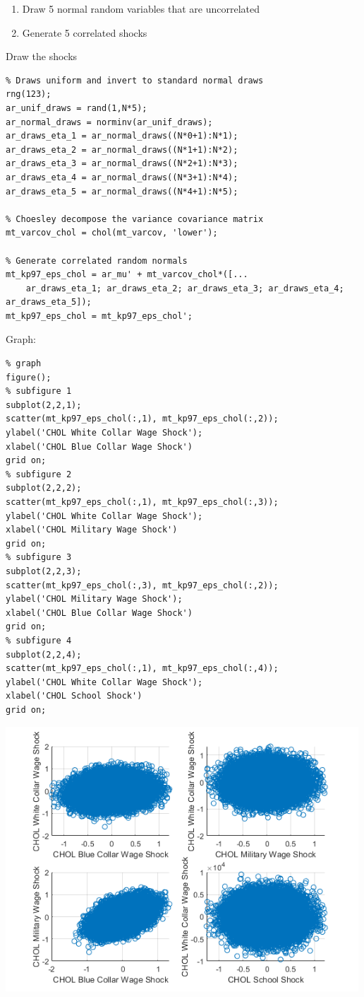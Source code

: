 \documentclass[
]{book}
\begin{document}
\begin{enumerate}
\def\labelenumi{\arabic{enumi}.}
\item
  Draw 5 normal random variables that are uncorrelated
\item
  Generate 5 correlated shocks
\end{enumerate}

Draw the shocks

\begin{verbatim}
% Draws uniform and invert to standard normal draws
rng(123);
ar_unif_draws = rand(1,N*5);
ar_normal_draws = norminv(ar_unif_draws);
ar_draws_eta_1 = ar_normal_draws((N*0+1):N*1);
ar_draws_eta_2 = ar_normal_draws((N*1+1):N*2);
ar_draws_eta_3 = ar_normal_draws((N*2+1):N*3);
ar_draws_eta_4 = ar_normal_draws((N*3+1):N*4);
ar_draws_eta_5 = ar_normal_draws((N*4+1):N*5);

% Choesley decompose the variance covariance matrix
mt_varcov_chol = chol(mt_varcov, 'lower');

% Generate correlated random normals
mt_kp97_eps_chol = ar_mu' + mt_varcov_chol*([...
    ar_draws_eta_1; ar_draws_eta_2; ar_draws_eta_3; ar_draws_eta_4; ar_draws_eta_5]);
mt_kp97_eps_chol = mt_kp97_eps_chol';
\end{verbatim}

Graph:

\begin{verbatim}
% graph
figure();
% subfigure 1
subplot(2,2,1);
scatter(mt_kp97_eps_chol(:,1), mt_kp97_eps_chol(:,2));
ylabel('CHOL White Collar Wage Shock');
xlabel('CHOL Blue Collar Wage Shock')
grid on;
% subfigure 2
subplot(2,2,2);
scatter(mt_kp97_eps_chol(:,1), mt_kp97_eps_chol(:,3));
ylabel('CHOL White Collar Wage Shock');
xlabel('CHOL Military Wage Shock')
grid on;
% subfigure 3
subplot(2,2,3);
scatter(mt_kp97_eps_chol(:,3), mt_kp97_eps_chol(:,2));
ylabel('CHOL Military Wage Shock');
xlabel('CHOL Blue Collar Wage Shock')
grid on;
% subfigure 4
subplot(2,2,4);
scatter(mt_kp97_eps_chol(:,1), mt_kp97_eps_chol(:,4));
ylabel('CHOL White Collar Wage Shock');
xlabel('CHOL School Shock')
grid on;
\end{verbatim}

\includegraphics[width=5.20833in,height=\textheight]{img/fs_cholesky_decomposition_d5_images/figure_1.png}
\end{document}

